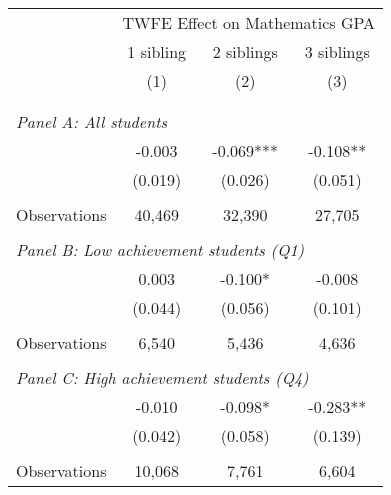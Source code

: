 \makeatletter
{}
{
\makeatother
\begin{tabular}{lccc}
\toprule
\cmidrule(lr){2-4}
& \multicolumn{3}{c}{TWFE Effect on Mathematics GPA} \\
\cmidrule(lr){2-4}
& 1 sibling & 2 siblings & 3 siblings  \\
\cmidrule(lr){2-2} \cmidrule(lr){3-3} \cmidrule(lr){4-4}
& (1) & (2) & (3)\\
\bottomrule
&  &  &  \\
&  &  &   \\
\multicolumn{4}{l}{\textit{Panel A: All students}} \\
\hspace{3mm}        &      -0.003   &      -0.069***&      -0.108** \\
                    &     (0.019)   &     (0.026)   &     (0.051)   \\
                    &               &               &               \\
\hspace{3mm}Observations&      40,469   &      32,390   &      27,705   \\
 
&  &  &   \\
\multicolumn{4}{l}{\textit{Panel B: Low achievement students (Q1)}} \\
\hspace{3mm}        &       0.003   &      -0.100*  &      -0.008   \\
                    &     (0.044)   &     (0.056)   &     (0.101)   \\
                    &               &               &               \\
\hspace{3mm}Observations&       6,540   &       5,436   &       4,636   \\
 
&  &  &   \\
\multicolumn{4}{l}{\textit{Panel C: High achievement students (Q4)}} \\
\hspace{3mm}        &      -0.010   &      -0.098*  &      -0.283** \\
                    &     (0.042)   &     (0.058)   &     (0.139)   \\
                    &               &               &               \\
\hspace{3mm}Observations&      10,068   &       7,761   &       6,604   \\
 

\end{tabular}}
